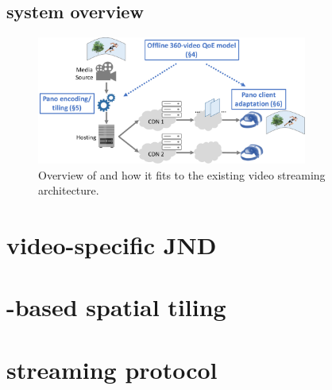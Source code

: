 \subsection{\name system overview}


\begin{figure}[t!]
  \centering
  \includegraphics[width=3.5in]{figures/overview.pdf}
  \caption{Overview of \name and how it fits to the existing \vr video streaming architecture.}
  \label{fig:overview}
  \end{figure}



%
%
%
%
%
%




\section{\vr video-specific JND}

\section{\vrjnd-based spatial tiling}

\section{\name streaming protocol}
